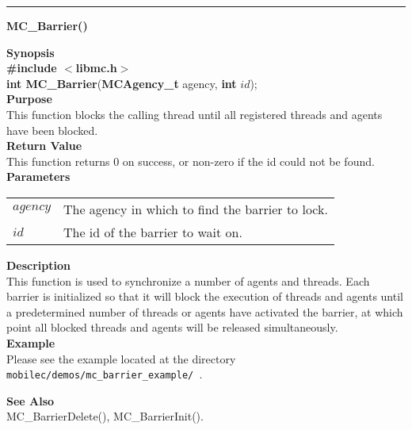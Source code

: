 \noindent
\vspace{5pt}
\rule{6.5in}{0.015in}
\noindent
{}
{\LARGE \bf MC\_Barrier()}\\
\label{api:MC_Barrier()}

\noindent
{\bf Synopsis}\\
{\bf \#include $<$libmc.h$>$}\\
{\bf int MC\_Barrier}({\bf MCAgency\_t} agency, {\bf int} $id$);\\

\noindent
{\bf Purpose}\\
This function blocks the calling thread until all registered threads and
agents have been blocked. \\

\noindent
{\bf Return Value}\\
This function returns 0 on success, or non-zero if the id could not be found. \\

\noindent
{\bf Parameters}
\vspace{-0.1pt}
\begin{description}
\item
\begin{tabular}{p{10 mm}p{145 mm}} 
$agency$ & The agency in which to find the barrier to lock.\\
$id$ & The id of the barrier to wait on. 
\end{tabular}
\end{description}

\noindent
{\bf Description}\\
This function is used to synchronize a number of agents and threads. Each barrier
is initialized so that it will block the execution of threads and agents until 
a predetermined number of threads or agents have activated the barrier, at which
point all blocked threads and agents will be released simultaneously. 
    \\

\noindent
{\bf Example}\\
Please see the example located at the directory
\texttt{ mobilec/demos/mc\_barrier\_example/ }. \\

\noindent

\noindent
{\bf See Also}\\
MC\_BarrierDelete(), MC\_BarrierInit(). \\

